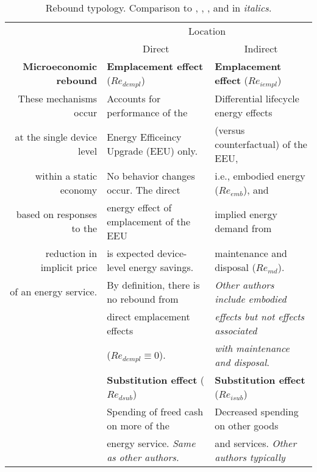 \begin{table}
\footnotesize
\begin{center}
\caption{Rebound typology. Comparison to \citet{Sorrell:2009cg}, \citet{Jenkins2011}, 
                           \citet{Thomas:2013aa,Thomas:2013ab}, and \citet{Walnum2014} in \emph{italics}.}
\label{tab:rebound_typology}
\begin{tabular}{ r l l }
\toprule
                                   & \multicolumn{2}{c}{Location} \\ 
                                   & \multicolumn{1}{c}{Direct}                  & \multicolumn{1}{c}{Indirect} \\
                                   \cmidrule{2-3}
\textbf{Microeconomic rebound}     & \textbf{Emplacement effect} ($Re_{dempl}$)  & \textbf{Emplacement effect} ($Re_{iempl}$) \\
These mechanisms occur             & Accounts for performance of the             & Differential lifecycle energy effects \\
at the single device level         & Energy Efficeincy Upgrade (EEU) only.       & (versus counterfactual) of the EEU, \\
within a static economy            & No behavior changes occur. The direct       & i.e., embodied energy ($Re_{emb}$), and \\
based on responses to the          & energy effect of emplacement of the EEU     & implied energy demand from \\
reduction in implicit price        & is expected device-level energy savings.    & maintenance and disposal ($Re_{md}$). \\
of an energy service.              & By definition, there is no rebound from     & \emph{Other authors include embodied} \\
                                   & direct emplacement effects                  & \emph{effects but not effects associated} \\
                                   & ($Re_{dempl} \equiv 0$).                    & \emph{with maintenance and disposal}. \\
                                   \cmidrule{2-3}
                                   & \textbf{Substitution effect} ($Re_{dsub}$)  & \textbf{Substitution effect} ($Re_{isub}$) \\
                                   & Spending of freed cash on more of the       & Decreased spending on other goods  \\
                                   & energy service. \emph{Same as other authors.}  & and services. \emph{Other authors typically} \\

\end{tabular}
\end{center}
\end{table}
